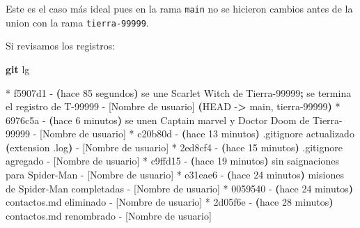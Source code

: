 \documentclass[
]{book}
\newenvironment{Shaded}{\begin{snugshade}}{\end{snugshade}}
\newcommand{\AttributeTok}[1]{\textcolor[rgb]{0.13,0.29,0.53}{#1}}
\newcommand{\ErrorTok}[1]{\textcolor[rgb]{0.64,0.00,0.00}{\textbf{#1}}}
\newcommand{\ExtensionTok}[1]{#1}
\newcommand{\FunctionTok}[1]{\textcolor[rgb]{0.13,0.29,0.53}{\textbf{#1}}}
\newcommand{\KeywordTok}[1]{\textcolor[rgb]{0.13,0.29,0.53}{\textbf{#1}}}
\newcommand{\NormalTok}[1]{#1}
\newcommand{\OperatorTok}[1]{\textcolor[rgb]{0.81,0.36,0.00}{\textbf{#1}}}
\begin{document}
Este es el caso más ideal pues en la rama \texttt{main} no se hicieron cambios antes de la union con la rama \texttt{tierra-99999}.

Si revisamos los registros:

\begin{Shaded}
\begin{Highlighting}[]
\FunctionTok{git}\NormalTok{ lg}
\end{Highlighting}
\end{Shaded}

\begin{Shaded}
\begin{Highlighting}[]
\ExtensionTok{*}\NormalTok{ f5907d1 }\AttributeTok{{-}} \ErrorTok{(}\ExtensionTok{hace}\NormalTok{ 85 segundos}\KeywordTok{)} \ExtensionTok{se}\NormalTok{ une Scarlet Witch de Tierra{-}99999}\KeywordTok{;} \ExtensionTok{se}\NormalTok{ termina el registro de T{-}99999 }\AttributeTok{{-}}\NormalTok{ [Nombre de usuario] }\ErrorTok{(}\ExtensionTok{HEAD} \AttributeTok{{-}}\OperatorTok{\textgreater{}}\NormalTok{ main, tierra{-}99999}\KeywordTok{)}
\ExtensionTok{*}\NormalTok{ 6976c5a }\AttributeTok{{-}} \ErrorTok{(}\ExtensionTok{hace}\NormalTok{ 6 minutos}\KeywordTok{)} \ExtensionTok{se}\NormalTok{ unen Captain marvel y Doctor Doom de Tierra{-}99999 }\AttributeTok{{-}}\NormalTok{ [Nombre de usuario]}
\ExtensionTok{*}\NormalTok{ c20b80d }\AttributeTok{{-}} \ErrorTok{(}\ExtensionTok{hace}\NormalTok{ 13 minutos}\KeywordTok{)} \ExtensionTok{.gitignore}\NormalTok{ actualizado }\ErrorTok{(}\ExtensionTok{extension}\NormalTok{ .log}\KeywordTok{)} \ExtensionTok{{-}}\NormalTok{ [Nombre de usuario]}
\ExtensionTok{*}\NormalTok{ 2ed8cf4 }\AttributeTok{{-}} \ErrorTok{(}\ExtensionTok{hace}\NormalTok{ 15 minutos}\KeywordTok{)} \ExtensionTok{.gitignore}\NormalTok{ agregado }\AttributeTok{{-}}\NormalTok{ [Nombre de usuario]}
\ExtensionTok{*}\NormalTok{ c9ffd15 }\AttributeTok{{-}} \ErrorTok{(}\ExtensionTok{hace}\NormalTok{ 19 minutos}\KeywordTok{)} \ExtensionTok{sin}\NormalTok{ saignaciones para Spider{-}Man }\AttributeTok{{-}}\NormalTok{ [Nombre de usuario]}
\ExtensionTok{*}\NormalTok{ e31eae6 }\AttributeTok{{-}} \ErrorTok{(}\ExtensionTok{hace}\NormalTok{ 24 minutos}\KeywordTok{)} \ExtensionTok{misiones}\NormalTok{ de Spider{-}Man completadas }\AttributeTok{{-}}\NormalTok{ [Nombre de usuario]}
\ExtensionTok{*}\NormalTok{ 0059540 }\AttributeTok{{-}} \ErrorTok{(}\ExtensionTok{hace}\NormalTok{ 24 minutos}\KeywordTok{)} \ExtensionTok{contactos.md}\NormalTok{ eliminado }\AttributeTok{{-}}\NormalTok{ [Nombre de usuario]}
\ExtensionTok{*}\NormalTok{ 2d05f6e }\AttributeTok{{-}} \ErrorTok{(}\ExtensionTok{hace}\NormalTok{ 28 minutos}\KeywordTok{)} \ExtensionTok{contactos.md}\NormalTok{ renombrado }\AttributeTok{{-}}\NormalTok{ [Nombre de usuario]}

\end{Highlighting}
\end{Shaded}
\end{document}
